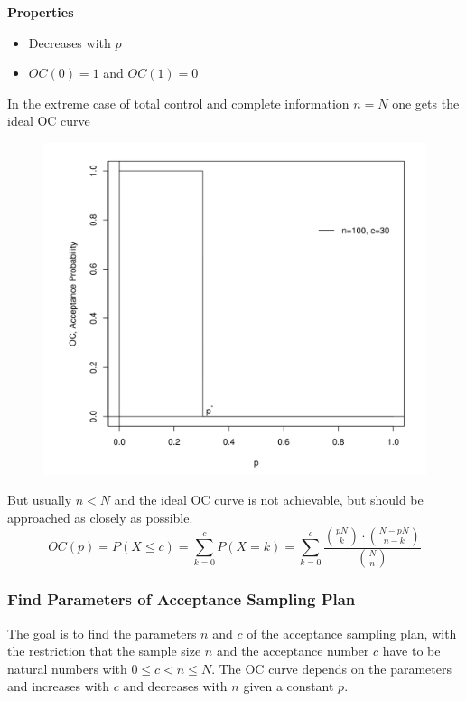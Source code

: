 \documentclass[11pt]{article}
\theoremstyle{definition}
\begin{document}
\vspace{0.5em}
\noindent
\textbf{Properties}
\begin{itemize}
	\item Decreases with $p$
	\item $OC(0) = 1$ and $OC(1) = 0$
\end{itemize}
In the extreme case of total control and complete information $n=N$ one gets the ideal OC curve
\begin{figure}[H]
	\centering
	\includegraphics[width=0.5\linewidth]{img/ideal_OC_curve}
\end{figure}
But usually $n<N$ and the ideal OC curve is not achievable, but should be approached as closely as possible.
\begin{equation*}
	OC(p) = P(X\leq c) = \sum_{k=0}^c P(X=k) = \sum_{k=0}^c \frac{\binom{pN}{k}\cdot\binom{N-pN}{n - k}}{\binom{N}{n}}
\end{equation*}

\subsubsection{Find Parameters of Acceptance Sampling Plan}
The goal is to find the parameters $n$ and $c$ of the acceptance sampling plan, with the restriction that the sample size $n$ and the acceptance number $c$ have to be natural numbers with $0\leq c<n \leq N$. The OC curve depends on the parameters and increases with $c$ and decreases with $n$ given a constant $p$.
\end{document}
